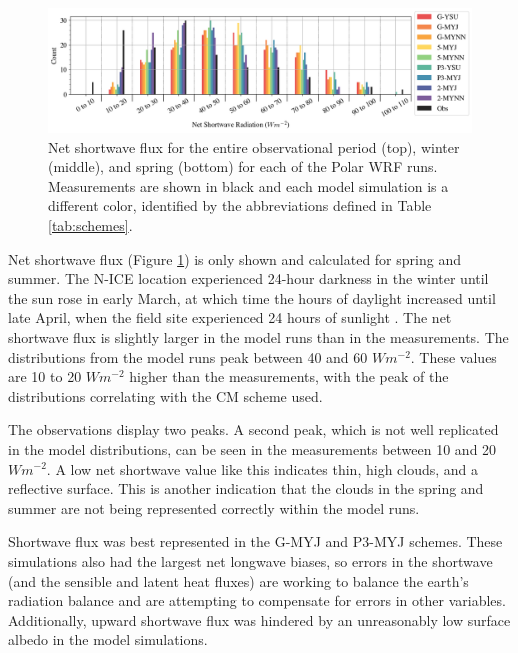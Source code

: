 \begin{figure}[h!]
    \centering
    \includegraphics[width=1\linewidth]{figures/chapter3/WRF_NetSW_Histo.png}
    \caption[Polar WRF simulated net shortwave flux histograms.]{Net shortwave flux for the entire observational period (top), winter (middle), and spring (bottom) for each of the Polar WRF runs. Measurements are shown in black and each model simulation is a different color, identified by the abbreviations defined in Table \ref{tab:schemes}.}
    \label{fig:wrf_netsw}
\end{figure}

Net shortwave flux (Figure \ref{fig:wrf_netsw}) is only shown and calculated for spring and summer. The N-ICE location experienced 24-hour darkness in the winter until the sun rose in early March, at which time the hours of daylight increased until late April, when the field site experienced 24 hours of sunlight \citep{walden:2017}. The net shortwave flux is slightly larger in the model runs than in the measurements. The distributions from the model runs peak between 40 and 60 $Wm^{-2}$. These values are 10 to 20 $Wm^{-2}$ higher than the measurements, with the peak of the distributions correlating with the CM scheme used. 

The observations display two peaks. A second peak, which is not well replicated in the model distributions, can be seen in the measurements between 10 and 20 $Wm^{-2}$. A low net shortwave value like this indicates thin, high clouds, and a reflective surface. This is another indication that the clouds in the spring and summer are not being represented correctly within the model runs. 

Shortwave flux was best represented in the G-MYJ and P3-MYJ schemes. These simulations also had the largest net longwave biases, so errors in the shortwave (and the sensible and latent heat fluxes) are working to balance the earth's radiation balance and are attempting to compensate for errors in other variables. Additionally, upward shortwave flux was hindered by an unreasonably low surface albedo in the model simulations.

